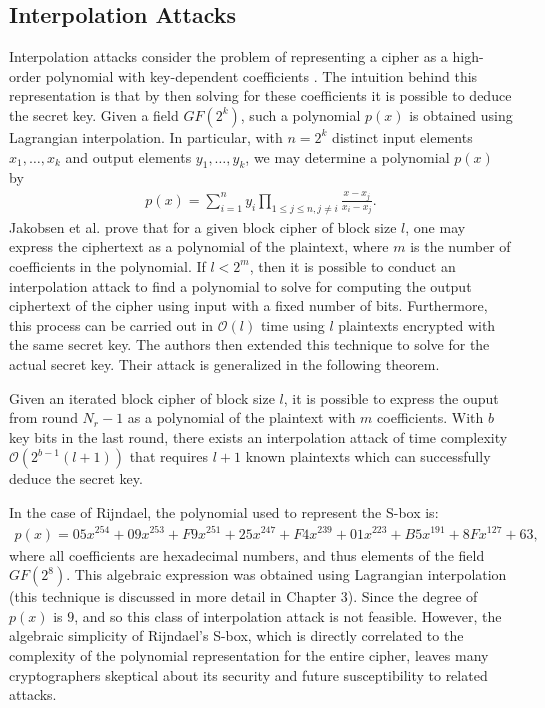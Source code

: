 \subsection{Interpolation Attacks} \label{sec:sublayer_interpolation}
Interpolation attacks consider the problem of representing a cipher as a high-order polynomial with key-dependent coefficients \cite{Jakobsen97-1}. The intuition behind this representation is that by then solving for these coefficients it is possible to deduce the secret key. Given a field $GF(2^k)$, such a polynomial $p(x)$ is obtained using Lagrangian interpolation. In particular, with $n = 2^k$ distinct input elements $x_1,\dots,x_k$ and output elements $y_1,\dots,y_k$, we may determine a polynomial $p(x)$ by
\begin{align*}
p(x) = \sum_{i=1}^{n} y_i \prod_{1 \leq j \leq n, j \not= i} \frac{x - x_j}{x_i - x_j}.
\end{align*}
Jakobsen et al. \cite{Jakobsen97-1} prove that for a given block cipher of block size $l$, one may express the ciphertext as a polynomial of the plaintext, where $m$ is the number of coefficients in the polynomial. If $l < 2^m$, then it is possible to conduct an interpolation attack to find a polynomial to solve for computing the output ciphertext of the cipher using input with a fixed number of bits. Furthermore, this process can be carried out in $\mathcal{O}(l)$ time using $l$ plaintexts encrypted with the same secret key. The authors then extended this technique to solve for the actual secret key. Their attack is generalized in the following theorem.
\begin{thm}
\cite{Jakobsen97-1} Given an iterated block cipher of block size $l$, it is possible to express the ouput from round $N_r - 1$ as a polynomial of the plaintext with $m$ coefficients. With $b$ key bits in the last round, there exists an interpolation attack of time complexity $\mathcal{O}(2^{b - 1}(l + 1))$ that requires $l + 1$ known plaintexts which can successfully deduce the secret key. 
\end{thm}
In the case of Rijndael, the polynomial used to represent the S-box is:
\begin{align*}
p(x) = 05x^{254} + 09x^{253} + F9x^{251} + 25x^{247} + F4x^{239} + 01x^{223} + B5x^{191} + 8Fx^{127} + 63,
\end{align*}
where all coefficients are hexadecimal numbers, and thus elements of the field $GF(2^8)$. This algebraic expression was obtained using Lagrangian interpolation \cite{Daemen02-1} (this technique is discussed in more detail in Chapter 3). Since the degree of $p(x)$ is $9$, and so this class of interpolation attack is not feasible. However, the algebraic simplicity of Rijndael's S-box, which is directly correlated to the complexity of the polynomial representation for the entire cipher, leaves many cryptographers skeptical about its security and future susceptibility to related attacks.

